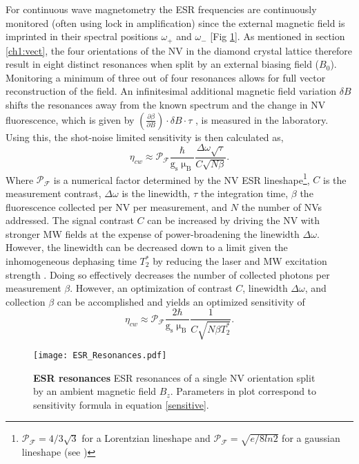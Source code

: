 For continuous wave magnetometry the ESR frequencies are continuously monitored (often using lock in amplification) since the external magnetic field is imprinted in their spectral positions $\omega_+$ and $\omega_-$ [Fig \ref{ESRfreq}]. As mentioned in section \ref{ch1:vect}, the four orientations of the NV in the diamond crystal lattice therefore result in eight distinct resonances when split by an external biasing field ($B_0$). Monitoring a minimum of three out of four resonances allows for full vector reconstruction of the field. An infinitesimal additional magnetic field variation $\delta B$ shifts the resonances away from the known spectrum and the change in NV fluorescence, which is given by $\left(\frac{\partial \beta}{\partial B}\right) \cdot \delta B \cdot \tau$ \cite{rondin2014magnetometry}, is measured in the laboratory. Using this, the shot-noise limited sensitivity is then calculated as,
\begin{equation} \label{sensitive}
\eta_{cw} \approx \mathcal{P}_\mathcal{F}\frac{\hbar}{\text{g}_\text{s} \upmu_\text{B}} \frac{\Delta \omega \sqrt{\tau}}{C\sqrt{N \beta}}. 
\end{equation}
Where $\mathcal{P}_{\mathcal{F}}$ is a numerical factor determined by the NV ESR lineshape\footnote{$\mathcal{P}_\mathcal{F} = 4/3\sqrt{3}$ for a Lorentzian lineshape and $\mathcal{P}_\mathcal{F} = \sqrt{e/8ln2}$ for a gaussian lineshape (see \cite{pham2013magnetic})}, $C$ is the measurement contrast, $\Delta \omega$ is the linewidth, $\tau$ the integration time, $\beta$ the fluorescence collected per NV per measurement, and $N$ the number of NVs addressed.
The signal contrast $C$ can be increased by driving the NV with stronger MW fields at the expense of power-broadening the linewidth $\Delta \omega$. However, the linewidth can be decreased down to a limit given the inhomogeneous dephasing time $T_2^*$ by reducing the laser and MW excitation strength \cite{dreau2011avoiding}. Doing so effectively decreases the number of collected photons per measurement $\beta$. However, an optimization of contrast $C$, linewidth $\Delta \omega$, and collection $\beta$ can be accomplished and yields an optimized sensitivity of \cite{pham2013magnetic}
\begin{equation}
\eta_{cw} \approx  \mathcal{P}_\mathcal{F}\frac{2\hbar}{\text{g}_\text{s} \upmu_\text{B}} \frac{1}{C\sqrt{N \beta T_2^*}}.
\end{equation}

\begin{figure}[t!]
\centering
\texttt{[image: ESR\_Resonances.pdf]}  
\caption{\textbf{ESR resonances} ESR resonances of a single NV orientation split by an ambient magnetic field $B_z$. Parameters in plot correspond to sensitivity formula in equation \ref{sensitive}.}
\label{ESRfreq}
\end{figure}

